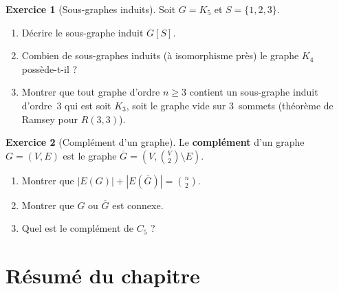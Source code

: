 \documentclass[12pt,a4paper,openany]{book}
\theoremstyle{definition}
\newtheorem{exercice}{Exercice}[chapter]
\theoremstyle{plain}
\theoremstyle{remark}
\newcommand{\abs}[1]{\left|#1\right|}
\begin{document}
\begin{exercice}[Sous-graphes induits]
\label{exo:sous-graphe-induit}
Soit $G = K_5$ et $S = \{1, 2, 3\}$.
\begin{enumerate}[label=(\alph*)]
  \item Décrire le sous-graphe induit $G[S]$.
  \item Combien de sous-graphes induits (à isomorphisme près) le graphe $K_4$
    possède-t-il ?
  \item Montrer que tout graphe d'ordre $n \geq 3$ contient un sous-graphe
    induit d'ordre~$3$ qui est soit $K_3$, soit le graphe vide sur $3$~sommets
    (théorème de Ramsey pour $R(3,3)$).
\end{enumerate}
\end{exercice}

\begin{exercice}[Complément d'un graphe]
\label{exo:complement}
Le \textbf{complément} d'un graphe $G = (V, E)$ est le graphe
$\overline{G} = (V, \binom{V}{2} \setminus E)$.
\begin{enumerate}[label=(\alph*)]
  \item Montrer que $\abs{E(G)} + \abs{E(\overline{G})} = \binom{n}{2}$.
  \item Montrer que $G$ ou $\overline{G}$ est connexe.
  \item Quel est le complément de $C_5$ ?
\end{enumerate}
\end{exercice}

\section*{Résumé du chapitre}
\end{document}
